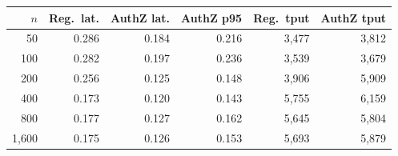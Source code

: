 \begin{tabular}{@{}rrrrrr@{}}
\toprule
$n$ & Reg.\ lat. & AuthZ lat. & AuthZ p95 & Reg.\ tput & AuthZ tput \\
\midrule
50 & 0.286 & 0.184 & 0.216 & 3{,}477 & 3{,}812 \\
100 & 0.282 & 0.197 & 0.236 & 3{,}539 & 3{,}679 \\
200 & 0.256 & 0.125 & 0.148 & 3{,}906 & 5{,}909 \\
400 & 0.173 & 0.120 & 0.143 & 5{,}755 & 6{,}159 \\
800 & 0.177 & 0.127 & 0.162 & 5{,}645 & 5{,}804 \\
1{,}600 & 0.175 & 0.126 & 0.153 & 5{,}693 & 5{,}879 \\
\bottomrule
\end{tabular}